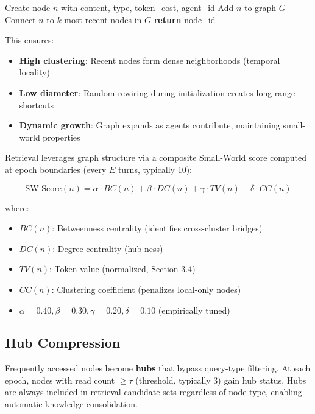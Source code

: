 \documentclass[11pt]{article}
\begin{document}
\begin{algorithm}
\caption{Knowledge Node Insertion}
\begin{algorithmic}[1]
\STATE Create node $n$ with content, type, token\_cost, agent\_id
\STATE Add $n$ to graph $G$
\STATE Connect $n$ to $k$ most recent nodes in $G$
\STATE \textbf{return} node\_id
\end{algorithmic}
\end{algorithm}

This ensures:
\begin{itemize}
    \item \textbf{High clustering}: Recent nodes form dense neighborhoods (temporal locality)
    \item \textbf{Low diameter}: Random rewiring during initialization creates long-range shortcuts
    \item \textbf{Dynamic growth}: Graph expands as agents contribute, maintaining small-world properties
\end{itemize}

Retrieval leverages graph structure via a composite Small-World score computed at epoch boundaries (every $E$ turns, typically 10):

\begin{equation}
\text{SW-Score}(n) = \alpha \cdot BC(n) + \beta \cdot DC(n) + \gamma \cdot TV(n) - \delta \cdot CC(n)
\end{equation}

where:
\begin{itemize}
    \item $BC(n)$: Betweenness centrality (identifies cross-cluster bridges)
    \item $DC(n)$: Degree centrality (hub-ness)
    \item $TV(n)$: Token value (normalized, Section 3.4)
    \item $CC(n)$: Clustering coefficient (penalizes local-only nodes)
    \item $\alpha=0.40, \beta=0.30, \gamma=0.20, \delta=0.10$ (empirically tuned)
\end{itemize}

\subsection{Hub Compression}

Frequently accessed nodes become \textbf{hubs} that bypass query-type filtering. At each epoch, nodes with read count $\geq \tau$ (threshold, typically 3) gain hub status. Hubs are always included in retrieval candidate sets regardless of node type, enabling automatic knowledge consolidation.
\end{document}
